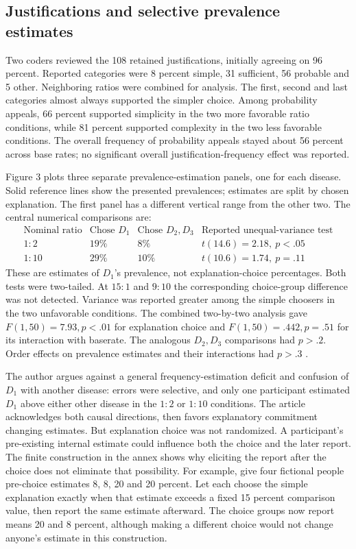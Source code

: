 \subsection{Justifications and selective prevalence estimates}

Two coders reviewed the 108 retained justifications, initially
agreeing on 96 percent. Reported categories were 8 percent
simple, 31 sufficient, 56 probable and 5 other.
Neighboring ratios were combined for analysis.
The first, second and last categories almost always supported
the simpler choice. Among probability appeals, 66 percent
supported simplicity in the two more favorable ratio conditions,
while 81 percent supported complexity in the two less favorable
conditions. The overall frequency of probability appeals stayed
about 56 percent across base rates; no significant overall
justification-frequency effect was reported.

Figure 3 plots three separate prevalence-estimation panels,
one for each disease. Solid reference lines show the presented
prevalences; estimates are split by chosen explanation.
The first panel has a different vertical range from the other
two. The central numerical comparisons are:
\[
\begin{array}{c|rr|l}
 \text{Nominal ratio}&
 \text{Chose }D_1&\text{Chose }D_2,D_3&
 \text{Reported unequal-variance test}\\\hline
 1:2&19\%&8\%&t(14.6)=2.18,\ p<.05\\
 1:10&29\%&10\%&t(10.6)=1.74,\ p=.11
\end{array}
\]
These are estimates of \(D_1\)'s prevalence, not explanation-choice
percentages. Both tests were two-tailed. At \(15:1\) and \(9:10\)
the corresponding choice-group difference was not detected.
Variance was reported greater among the simple choosers in
the two unfavorable conditions.
The combined two-by-two analysis gave
\(F(1,50)=7.93,p<.01\) for explanation choice and
\(F(1,50)=.442,p=.51\) for its interaction with baserate.
The analogous \(D_2,D_3\) comparisons had \(p>.2\).
Order effects on prevalence estimates and their interactions
had \(p>.3\) \cite[pp.~248--249]{Lombrozo2007SimplicityProbability}.

The author argues against a general frequency-estimation deficit
and confusion of \(D_1\) with another disease: errors were selective,
and only one participant estimated \(D_1\) above either other disease
in the \(1:2\) or \(1:10\) conditions.
The article acknowledges both causal directions, then favors
explanatory commitment changing estimates. But explanation choice
was not randomized. A participant's pre-existing internal estimate
could influence both the choice and the later report.
The finite construction in the annex shows why eliciting the report
after the choice does not eliminate that possibility.
For example, give four fictional people pre-choice estimates
8, 8, 20 and 20 percent. Let each choose the simple explanation
exactly when that estimate exceeds a fixed 15 percent comparison
value, then report the same estimate afterward. The choice groups
now report means 20 and 8 percent, although making a different
choice would not change anyone's estimate in this construction.

